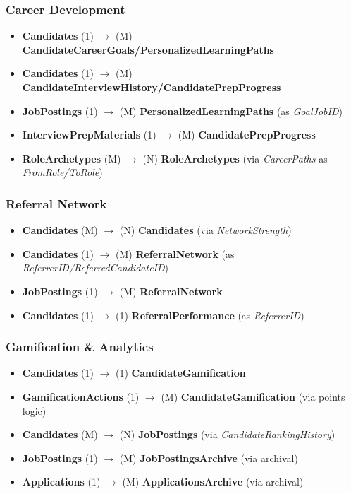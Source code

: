 \documentclass[11pt,a4paper]{article}
\begin{document}
\subsubsection*{Career Development}
\begin{itemize}
    \item \textbf{Candidates} (1) $\rightarrow$ (M) \textbf{CandidateCareerGoals/PersonalizedLearningPaths}
    \item \textbf{Candidates} (1) $\rightarrow$ (M) \textbf{CandidateInterviewHistory/CandidatePrepProgress}
    \item \textbf{JobPostings} (1) $\rightarrow$ (M) \textbf{PersonalizedLearningPaths} (as \textit{GoalJobID})
    \item \textbf{InterviewPrepMaterials} (1) $\rightarrow$ (M) \textbf{CandidatePrepProgress}
    \item \textbf{RoleArchetypes} (M) $\rightarrow$ (N) \textbf{RoleArchetypes} (via \textit{CareerPaths} as \textit{FromRole/ToRole})
\end{itemize}

\subsubsection*{Referral Network}
\begin{itemize}
    \item \textbf{Candidates} (M) $\rightarrow$ (N) \textbf{Candidates} (via \textit{NetworkStrength})
    \item \textbf{Candidates} (1) $\rightarrow$ (M) \textbf{ReferralNetwork} (as \textit{ReferrerID/ReferredCandidateID})
    \item \textbf{JobPostings} (1) $\rightarrow$ (M) \textbf{ReferralNetwork}
    \item \textbf{Candidates} (1) $\rightarrow$ (1) \textbf{ReferralPerformance} (as \textit{ReferrerID})
\end{itemize}

\subsubsection*{Gamification \& Analytics}
\begin{itemize}
    \item \textbf{Candidates} (1) $\rightarrow$ (1) \textbf{CandidateGamification}
    \item \textbf{GamificationActions} (1) $\rightarrow$ (M) \textbf{CandidateGamification} (via points logic)
    \item \textbf{Candidates} (M) $\rightarrow$ (N) \textbf{JobPostings} (via \textit{CandidateRankingHistory})
    \item \textbf{JobPostings} (1) $\rightarrow$ (M) \textbf{JobPostingsArchive} (via archival)
    \item \textbf{Applications} (1) $\rightarrow$ (M) \textbf{ApplicationsArchive} (via archival)
\end{itemize}
\end{document}
